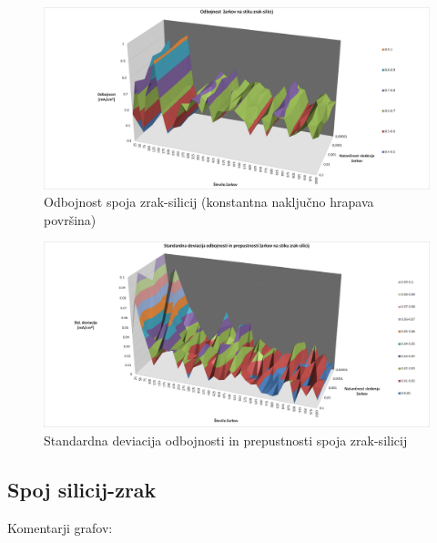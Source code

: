 \documentclass[a4paper,twoside,openright,12pt,slovene]{book}
\begin{document}
\begin{figure}[h]
    \centering
    \includegraphics[trim={335 2 20 2.5}, clip, width=160mm]{Slike/odbojnost3D_air_Si_contTexture.png}
    \caption{Odbojnost spoja zrak-silicij (konstantna naključno hrapava površina)}
    \label{fig:odb_air_Si}
\end{figure}

\begin{figure}[H]
    \centering
    \includegraphics[trim={20 1 10 1}, clip, width=150mm]{Slike/deviacija3D_air_Si_contTexture.png}
    \caption{Standardna deviacija odbojnosti in prepustnosti spoja zrak-silicij}
    \label{fig:std_air_Si}
\end{figure}

\clearpage

\subsection{Spoj silicij-zrak}

Komentarji grafov:
\end{document}
